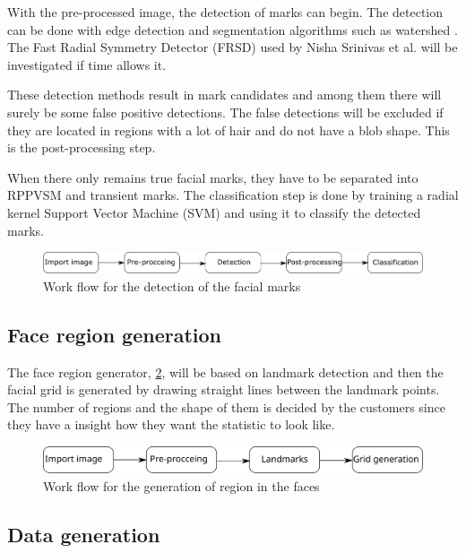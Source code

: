 With the pre-processed image, the detection of marks can begin. The detection can be done with edge detection and segmentation algorithms such as watershed \cite{segmentation_method, edge_method}. The Fast Radial Symmetry Detector (FRSD) used by Nisha Srinivas et al. \cite{automatic_detector_2015} will be investigated if time allows it. 

These detection methods result in mark candidates and among them there will surely be some false positive detections. The false detections will be excluded if they are located in regions with a lot of hair and do not have a blob shape. This is the post-processing step. \cite{automatic_detector_2015}

When there only remains true facial marks, they have to be separated into RPPVSM and transient marks. The classification step is done by training a radial kernel Support Vector Machine (SVM) and using it to classify the detected marks.  

\begin{figure}[H]
\centering
\includegraphics[width=1.0\linewidth]{"bilder/detection_flow"}
\caption{Work flow for the detection of the facial marks}
\label{fig:detection_flow}
\end{figure}

\subsection{Face region generation}

The face region generator, \cref{fig:grid_flow}, will be based on landmark detection and then the facial grid is generated by drawing straight lines between the landmark points. \cite{landmarks_SVM,landmarks_wild} The number of regions and the shape of them is decided by the customers since they have a insight how they want the statistic to look like. 

\begin{figure}[H]
	\centering
	\includegraphics[width=1.0\linewidth]{"bilder/Grid_flow"}
	\caption{Work flow for the generation of region in the faces}
	\label{fig:grid_flow}
\end{figure}

\subsection{Data generation}

